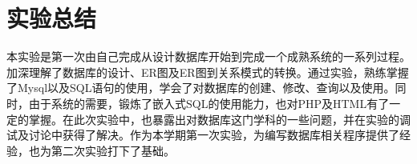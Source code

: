 \documentclass[a4paper, 11pt, nofonts, nocap, fancyhdr]{ctexart}
\begin{document}
\section{实验总结}

本实验是第一次由自己完成从设计数据库开始到完成一个成熟系统的一系列过程。加深理解了数据库的设计、ER图及ER图到关系模式的转换。通过实验，熟练掌握了Mysql以及SQL语句的使用，学会了对数据库的创建、修改、查询以及使用。同时，由于系统的需要，锻炼了嵌入式SQL的使用能力，也对PHP及HTML有了一定的掌握。在此次实验中，也暴露出对数据库这门学科的一些问题，并在实验的调试及讨论中获得了解决。作为本学期第一次实验，为编写数据库相关程序提供了经验，也为第二次实验打下了基础。
\end{document}
